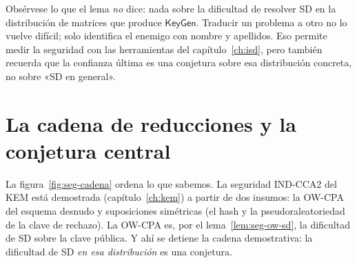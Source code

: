 Obsérvese lo que el lema \emph{no} dice: nada sobre la dificultad de
resolver SD en la distribución de matrices que produce
$\textsf{KeyGen}$. Traducir un problema a otro no lo vuelve difícil;
solo identifica el enemigo con nombre y apellidos. Eso permite medir
la seguridad con las herramientas del capítulo~\ref{ch:isd}, pero
también recuerda que la confianza última es una conjetura sobre esa
distribución concreta, no sobre «SD en general».

\section{La cadena de reducciones y la conjetura central}

La figura~\ref{fig:seg-cadena} ordena lo que sabemos. La seguridad
IND-CCA2 del KEM está demostrada (capítulo~\ref{ch:kem}) a partir de
dos insumos: la OW-CPA del esquema desnudo y suposiciones simétricas
(el hash y la pseudoraleatoriedad de la clave de rechazo). La OW-CPA
es, por el lema~\ref{lem:seg-ow-sd}, la dificultad de SD sobre la
clave pública. Y ahí se detiene la cadena demostrativa: la dificultad
de SD \emph{en esa distribución} es una conjetura.

